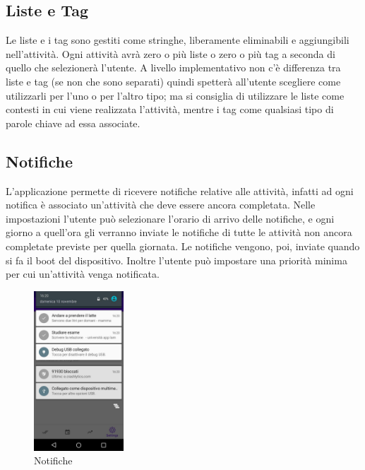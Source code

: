\documentclass[]{article}
\begin{document}
\hypertarget{liste-e-tag}{%
\subsection{Liste e Tag}\label{liste-e-tag}}

Le liste e i tag sono gestiti come stringhe, liberamente eliminabili e
aggiungibili nell'attività. Ogni attività avrà zero o più liste o zero o
più tag a seconda di quello che selezionerà l'utente. A livello
implementativo non c'è differenza tra liste e tag (se non che sono
separati) quindi spetterà all'utente scegliere come utilizzarli per
l'uno o per l'altro tipo; ma si consiglia di utilizzare le liste come
contesti in cui viene realizzata l'attività, mentre i tag come qualsiasi
tipo di parole chiave ad essa associate.

\hypertarget{notifiche}{%
\subsection{Notifiche}\label{notifiche}}

L'applicazione permette di ricevere notifiche relative alle attività,
infatti ad ogni notifica è associato un'attività che deve essere ancora
completata. Nelle impostazioni l'utente può selezionare l'orario di
arrivo delle notifiche, e ogni giorno a quell'ora gli verranno inviate
le notifiche di tutte le attività non ancora completate previste per
quella giornata. Le notifiche vengono, poi, inviate quando si fa il boot
del dispositivo. Inoltre l'utente può impostare una priorità minima per
cui un'attività venga notificata.

\begin{figure}
\centering
\includegraphics[width=0.3\textwidth,height=0.1\textheight]{./img/notifiche.jpg}
\caption{Notifiche}
\end{figure}
\end{document}
